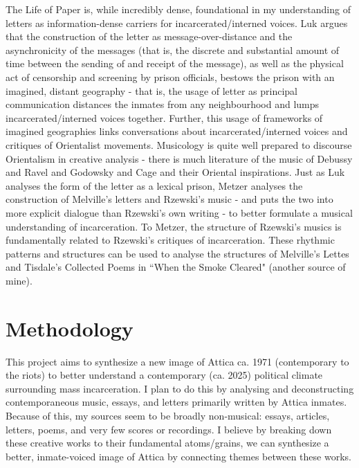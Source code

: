 \documentclass[12pt,letterpaper]{article}
\begin{document}
The Life of Paper is, while incredibly dense, foundational in my 
understanding of letters as information-dense carriers for 
incarcerated/interned voices. Luk argues that the construction of 
the letter as message-over-distance and the asynchronicity of the 
messages (that is, the discrete and substantial amount of time 
between the sending of and receipt of the message), as well as the 
physical act of censorship and screening by prison officials, bestows 
the prison with an imagined, distant geography - that is, the usage 
of letter as principal communication distances the inmates from 
any neighbourhood and lumps incarcerated/interned voices together. 
Further, this usage of frameworks of imagined geographies links 
conversations about incarcerated/interned voices and critiques of 
Orientalist movements. Musicology is quite well prepared to discourse 
Orientalism in creative analysis - there is much literature of the 
music of Debussy and Ravel and Godowsky and Cage and their Oriental 
inspirations. Just as Luk analyses the form of the letter as a 
lexical prison, Metzer analyses the construction of Melville's 
letters and Rzewski's music - and puts the two into more explicit 
dialogue than Rzewski's own writing - to better formulate a musical 
understanding of incarceration. To Metzer, the structure of Rzewski's 
musics is fundamentally related to Rzewski's critiques of incarceration. 
These rhythmic patterns and structures can be used to analyse the structures 
of Melville's Lettes and Tisdale's Collected Poems in ``When the Smoke Cleared" 
(another source of mine).

\section*{Methodology}

This project aims to synthesize a new image of Attica ca. 1971 
(contemporary to the riots) to better understand a contemporary (ca. 2025) 
political climate surrounding mass incarceration. I plan to do this 
by analysing and deconstructing contemporaneous music, essays, and letters 
primarily written by Attica inmates. Because of this, my sources seem to 
be broadly non-musical: essays, articles, letters, poems, and very few 
scores or recordings. I believe by breaking down these creative works 
to their fundamental atoms/grains, we can synthesize a better, inmate-voiced 
image of Attica by connecting themes between these works. 



\nocite{*}

\printbibliography
\end{document}
